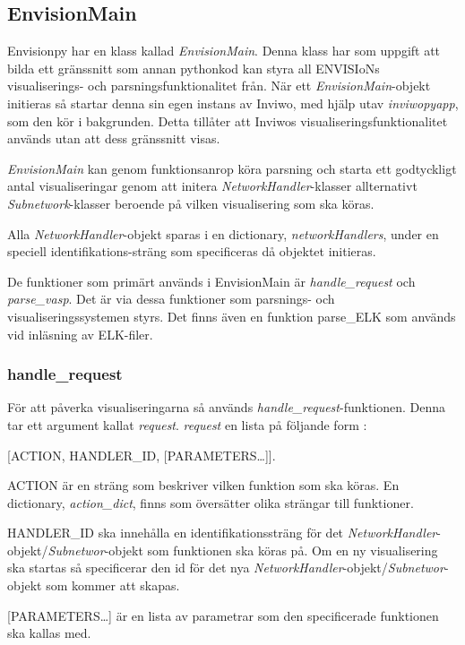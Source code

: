 \documentclass[10pt,oneside,swedish]{article}
\begin{document}
\subsection{EnvisionMain}\label{envisionmain}

Envisionpy har en klass kallad \emph{EnvisionMain}. Denna klass har som
uppgift att bilda ett gränssnitt som annan pythonkod kan styra all
ENVISIoNs visualiserings- och parsningsfunktionalitet från. När ett
\emph{EnvisionMain}-objekt initieras så startar denna sin egen instans
av Inviwo, med hjälp utav \emph{inviwopyapp}, som den kör i bakgrunden.
Detta tillåter att Inviwos visualiseringsfunktionalitet används utan att
dess gränssnitt visas.

\emph{EnvisionMain} kan genom funktionsanrop köra parsning och starta
ett godtyckligt antal visualiseringar genom att initera
\emph{NetworkHandler}-klasser allternativt \emph{Subnetwork}-klasser beroende på vilken visualisering som ska köras.

Alla \emph{NetworkHandler}-objekt sparas i en dictionary,
\emph{networkHandlers}, under en speciell identifikations-sträng som
specificeras då objektet initieras.

De funktioner som primärt används i EnvisionMain är
\emph{handle\_request} och \emph{parse\_vasp}. Det är
via dessa funktioner som parsnings- och visualiseringssystemen styrs. Det finns även en funktion parse\_ELK som används vid inläsning av ELK-filer.

\subsubsection{handle\_request}\label{handle_request}
För att påverka visualiseringarna så används
\emph{handle\_request}-funktionen. Denna tar ett argument kallat
\emph{request}. \emph{request} en lista på följande form :

{[}ACTION, HANDLER\_ID, {[}PARAMETERS\ldots{}{]}{]}.

ACTION är en sträng som beskriver vilken funktion som ska köras. En
dictionary, \emph{action\_dict}, finns som översätter olika strängar
till funktioner.

HANDLER\_ID ska innehålla en identifikationssträng för det
\emph{NetworkHandler}-objekt/\emph{Subnetwor}-objekt  som funktionen ska köras på. Om en ny
visualisering ska startas så specificerar den id för det nya
\emph{NetworkHandler}-objekt/\emph{Subnetwor}-objekt  som kommer att skapas.

{[}PARAMETERS\ldots{}{]} är en lista av parametrar som den specificerade
funktionen ska kallas med.
\end{document}
